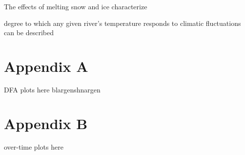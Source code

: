 \documentclass{article}
\begin{document}
The effects of melting snow and ice characterize

degree to which any given river's temperature responds to climatic fluctuations can be described


\section*{Appendix A}

DFA plots here blargenshnargen

\section*{Appendix B}

over-time plots here
\end{document}
